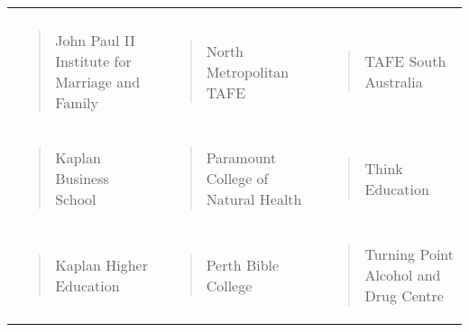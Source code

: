 \documentclass[]{book}
\begin{document}
\begin{longtable}[]{@{}lll@{}}
\begin{minipage}[t]{0.32\columnwidth}
\end{minipage}\tabularnewline
\begin{minipage}[t]{0.32\columnwidth}\raggedright
\begin{quote}
John Paul II Institute for Marriage and Family
\end{quote}\strut
\end{minipage} & \begin{minipage}[t]{0.32\columnwidth}\raggedright
\begin{quote}
North Metropolitan TAFE
\end{quote}\strut
\end{minipage} & \begin{minipage}[t]{0.32\columnwidth}\raggedright
\begin{quote}
TAFE South Australia
\end{quote}\strut
\end{minipage}\tabularnewline
\begin{minipage}[t]{0.32\columnwidth}\raggedright
\begin{quote}
Kaplan Business School
\end{quote}\strut
\end{minipage} & \begin{minipage}[t]{0.32\columnwidth}\raggedright
\begin{quote}
Paramount College of Natural Health
\end{quote}\strut
\end{minipage} & \begin{minipage}[t]{0.32\columnwidth}\raggedright
\begin{quote}
Think Education
\end{quote}\strut
\end{minipage}\tabularnewline
\begin{minipage}[t]{0.32\columnwidth}\raggedright
\begin{quote}
Kaplan Higher Education
\end{quote}\strut
\end{minipage} & \begin{minipage}[t]{0.32\columnwidth}\raggedright
\begin{quote}
Perth Bible College
\end{quote}\strut
\end{minipage} & \begin{minipage}[t]{0.32\columnwidth}\raggedright
\begin{quote}
Turning Point Alcohol and Drug Centre
\end{quote}\strut

\end{minipage}
\end{longtable}
\end{document}
